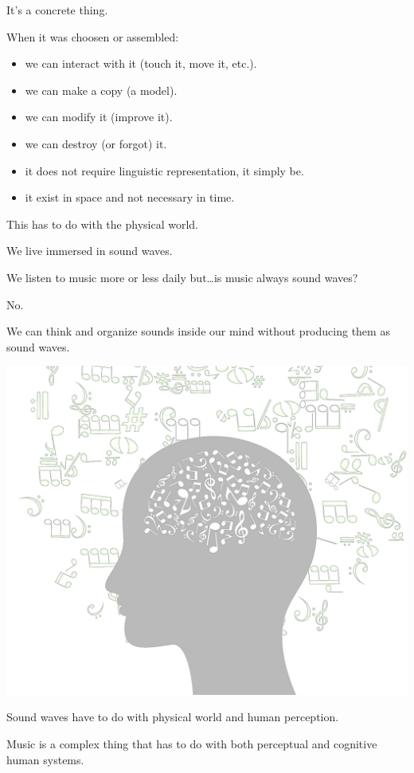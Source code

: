 It's a concrete thing.

When it was choosen or assembled:

\begin{itemize}
\tightlist
\item we can interact with it (touch it, move it, etc.).
\item we can make a copy (a model).
\item we can modify it (improve it).
\item we can destroy (or forgot) it.
\item it does not require linguistic representation, it simply be.
\item it exist in space and not necessary in time.
\end{itemize}

This has to do with the physical world.

We live immersed in sound waves.

We listen to music more or less daily but\ldots is music always sound waves?

No.

We can think and organize sounds inside our mind without producing them as sound waves.

\begin{center}
\includegraphics[scale=0.35]{../img/musicervice.png}
\end{center}

Sound waves have to do with physical world and human perception.

Music is a complex thing that has to do with both perceptual and cognitive human systems.

